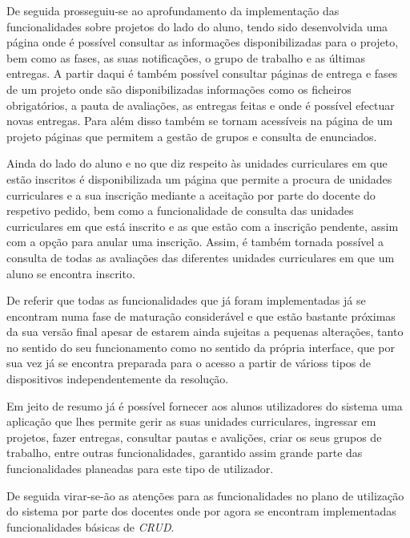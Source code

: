 De seguida prosseguiu-se ao aprofundamento da implementação das funcionalidades sobre projetos do lado do aluno, tendo sido desenvolvida uma página onde é possível consultar as informações disponibilizadas para o projeto, bem como as fases, as suas notificações, o grupo de trabalho e as últimas entregas.
A partir daqui é também possível consultar páginas de entrega e fases de um projeto onde são disponibilizadas informações como os ficheiros obrigatórios, a pauta de avaliações, as entregas feitas e onde é possível efectuar novas entregas.
Para além disso também se tornam acessíveis na página de um projeto páginas que permitem a gestão de grupos e consulta de enunciados.

Ainda do lado do aluno e no que diz respeito às unidades curriculares em que estão inscritos é disponibilizada um página que permite a procura de unidades curriculares e a sua inscrição mediante a aceitação por parte do docente do respetivo pedido, bem como a funcionalidade de consulta das unidades curriculares em que está inscrito e as que estão com a inscrição pendente, assim com a opção para anular uma inscrição.
Assim, é também tornada possível a consulta de todas as avaliações das diferentes unidades curriculares em que um aluno se encontra inscrito.

De referir que todas as funcionalidades que já foram implementadas já se encontram numa fase de maturação considerável e que estão bastante próximas da sua versão final apesar de estarem ainda sujeitas a pequenas alterações, tanto no sentido do seu funcionamento como no sentido da própria interface, que por sua vez já se encontra preparada para o acesso a partir de várioss tipos de dispositivos independentemente da resolução.

Em jeito de resumo já é possível fornecer aos alunos utilizadores do sistema uma aplicação que lhes permite gerir as suas unidades curriculares, ingressar em projetos, fazer entregas, consultar pautas e avalições, criar os seus grupos de trabalho, entre outras funcionalidades, garantido assim grande parte das funcionalidades planeadas para este tipo de utilizador.

De seguida virar-se-ão as atenções para as funcionalidades no plano de utilização do sistema por parte dos docentes onde por agora se encontram implementadas funcionalidades básicas de \textit{CRUD}.


\newpage
